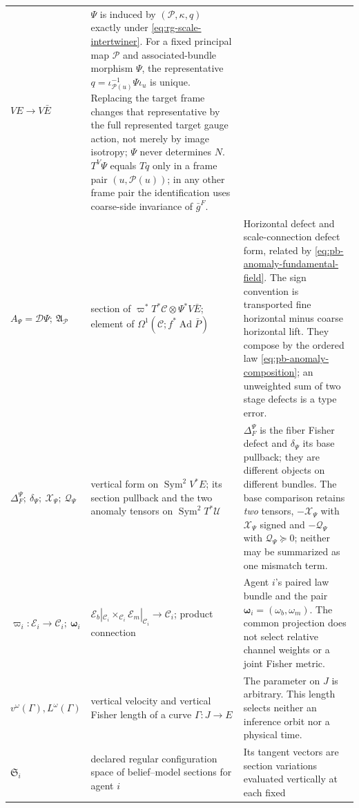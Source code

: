 \begin{longtable}{@{}>{\raggedright\arraybackslash}p{}
>{\raggedright\arraybackslash}p{}
>{\raggedright\arraybackslash}p{}@{}}
\(VE\to V\bar E\) &
\(\Psi\) is induced by \((\mathcal P,\kappa,q)\) exactly under
\eqref{eq:rg-scale-intertwiner}.  For a fixed principal map \(\mathcal P\) and
associated-bundle morphism \(\Psi\), the representative
\(q=\iota_{\mathcal P(u)}^{-1}\Psi\iota_u\) is unique.  Replacing the target
frame changes that representative by the full represented target gauge action,
not merely by image isotropy; \(\Psi\) never determines \(N\).  \(T^V\Psi\)
equals \(Tq\) only in a frame pair \((u,\mathcal P(u))\); in any other frame
pair the identification uses coarse-side invariance of \(\bar g^F\). \\
\(A_\Psi=\mathcal D\Psi;\ \mathfrak A_{\mathcal P}\) &
section of \(\varpi^*T^*\mathcal C\otimes\Psi^*V\bar E\); element of
\(\Omega^1(\mathcal C;f^*\operatorname{Ad}\bar P)\) &
Horizontal defect and scale-connection defect form, related by
\eqref{eq:pb-anomaly-fundamental-field}.  The sign convention is transported
fine horizontal minus coarse horizontal lift.  They compose by the ordered law
\eqref{eq:pb-anomaly-composition}; an unweighted sum of two stage defects is a
type error. \\
\(\Delta_F^\Psi;\ \delta_\Psi;\ \mathcal X_\Psi;\ \mathcal Q_\Psi\) &
vertical form on \(\operatorname{Sym}^2V^*E\); its section pullback and the two
anomaly tensors on \(\operatorname{Sym}^2T^*\mathcal U\) &
\(\Delta_F^\Psi\) is the fiber Fisher defect and \(\delta_\Psi\) its base
pullback; they are different objects on different bundles.  The base comparison
retains \emph{two} tensors, \(-\mathcal X_\Psi\) with \(\mathcal X_\Psi\)
signed and \(-\mathcal Q_\Psi\) with \(\mathcal Q_\Psi\succeq0\); neither may be
summarized as one mismatch term. \\
\(\varpi_i:\mathcal E_i\to\mathcal C_i;\ \boldsymbol\omega_i\) &
\(\mathcal E_b|_{\mathcal C_i}\times_{\mathcal C_i}
\mathcal E_m|_{\mathcal C_i}\to\mathcal C_i\); product connection &
Agent \(i\)'s paired law bundle and the pair
\(\boldsymbol\omega_i=(\omega_b,\omega_m)\).  The common projection does not
select relative channel weights or a joint Fisher metric. \\
\(v^\omega(\Gamma),L^\omega(\Gamma)\) &
vertical velocity and vertical Fisher length of a curve \(\Gamma:J\to E\) &
The parameter on \(J\) is arbitrary.  This length selects neither an
inference orbit nor a physical time. \\
\(\mathfrak S_i\) &
declared regular configuration space of belief--model sections for agent \(i\) &
Its tangent vectors are section variations evaluated vertically at each fixed

\end{longtable}
